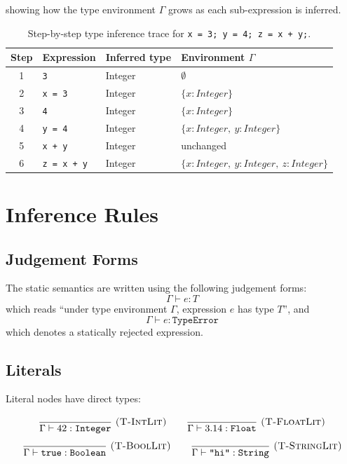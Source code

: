 \noindent showing how the type environment $\Gamma$ grows as each
sub-expression is inferred.

\begin{table}[H]
\centering
\caption{Step-by-step type inference trace for \texttt{x = 3; y = 4; z = x + y;}.\label{tab:type-inference-trace}}
\small
\begin{tabular}{clll}
\toprule
Step & Expression & Inferred type & Environment $\Gamma$ \\
\midrule
1 & \texttt{3}         & Integer & $\emptyset$ \\
2 & \texttt{x = 3}     & Integer & $\{x\!:\!\textit{Integer}\}$ \\
3 & \texttt{4}         & Integer & $\{x\!:\!\textit{Integer}\}$ \\
4 & \texttt{y = 4}     & Integer & $\{x\!:\!\textit{Integer},\ y\!:\!\textit{Integer}\}$ \\
5 & \texttt{x + y}     & Integer & unchanged \\
6 & \texttt{z = x + y} & Integer & $\{x\!:\!\textit{Integer},\ y\!:\!\textit{Integer},\ z\!:\!\textit{Integer}\}$ \\
\bottomrule
\end{tabular}
\end{table}

\section{Inference Rules}

\subsection{Judgement Forms}
The static semantics are written using the following judgement forms:
\[
\Gamma \vdash e : T
\]
which reads ``under type environment $\Gamma$, expression $e$ has type $T$'', and
\[
\Gamma \vdash e : \texttt{TypeError}
\]
which denotes a statically rejected expression.

\subsection{Literals}
Literal nodes have direct types:

\[
\frac{}{\Gamma \vdash 42 : \texttt{Integer}}\ \textsc{(T-IntLit)}
\qquad
\frac{}{\Gamma \vdash 3.14 : \texttt{Float}}\ \textsc{(T-FloatLit)}
\]
\[
\frac{}{\Gamma \vdash \texttt{true} : \texttt{Boolean}}\ \textsc{(T-BoolLit)}
\qquad
\frac{}{\Gamma \vdash \texttt{"hi"} : \texttt{String}}\ \textsc{(T-StringLit)}
\]

